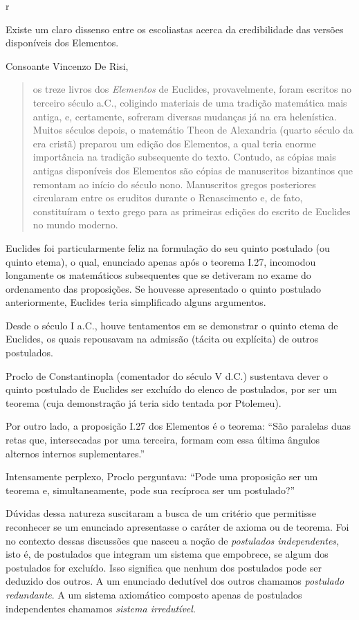 r\documentclass{hipatia}
\begin{document}
Existe um claro dissenso entre os escoliastas acerca da credibilidade das versões disponíveis dos Elementos. 

Consoante Vincenzo De Risi, 
\begin{quote}
os treze livros dos \emph{Elementos} de Euclides, provavelmente, foram escritos no terceiro século a.C., coligindo materiais de uma tradição matemática mais antiga, e, certamente, sofreram diversas mudanças já na era helenística. Muitos séculos depois, o matemátio Theon de Alexandria (quarto século da era cristã) preparou um edição dos Elementos, a qual teria enorme importância na tradição subsequente do texto. Contudo, as cópias mais antigas disponíveis dos Elementos são cópias de manuscritos bizantinos que remontam ao início do século nono. Manuscritos gregos posteriores circularam entre os eruditos durante o Renascimento e, de fato, constituíram o texto grego para as primeiras edições do escrito de Euclides no mundo moderno.  \cite[p.  595]{risi2016}
\end{quote}


Euclides foi particularmente feliz na formulação do seu quinto postulado (ou quinto etema), o qual, enunciado apenas após o teorema I.27, incomodou longamente os matemáticos subsequentes que se detiveram no exame do ordenamento das proposições. Se houvesse apresentado o quinto postulado anteriormente, Euclides teria simplificado alguns argumentos.

Desde o século I a.C., houve tentamentos em se demonstrar o quinto etema de Euclides, os quais repousavam na admissão (tácita ou explícita) de outros postulados. \cite[p. 2]{bonola1906}

Proclo de Constantinopla (comentador do século V d.C.) sustentava dever o quinto postulado de Euclides ser excluído do elenco de postulados, por ser um teorema (cuja demonstração já teria sido tentada por Ptolemeu).  \cite[p. 68]{coolidge1940}

Por outro lado, a  proposição I.27 dos Elementos é o teorema: ``São paralelas duas retas que, intersecadas por uma terceira, formam com essa última ângulos alternos internos suplementares.''

Intensamente perplexo, Proclo perguntava: ``Pode uma proposição ser um teorema e, simultaneamente, pode sua recíproca ser um postulado?''

Dúvidas dessa natureza suscitaram a busca de um critério que permitisse reconhecer se um enunciado apresentasse o caráter de axioma ou de teorema. Foi no contexto dessas discussões que nasceu a noção de \emph{postulados independentes}, isto é, de postulados que integram um sistema que empobrece, se algum dos postulados for excluído. Isso significa que nenhum dos postulados pode ser deduzido dos outros. A um enunciado dedutível dos outros chamamos \emph{postulado redundante}.  A um sistema axiomático composto apenas de postulados independentes chamamos \emph{sistema irredutível}.  \cite[p. 131]{moise1963}\cite[p. 985]{scanlan1988}
\end{document}
